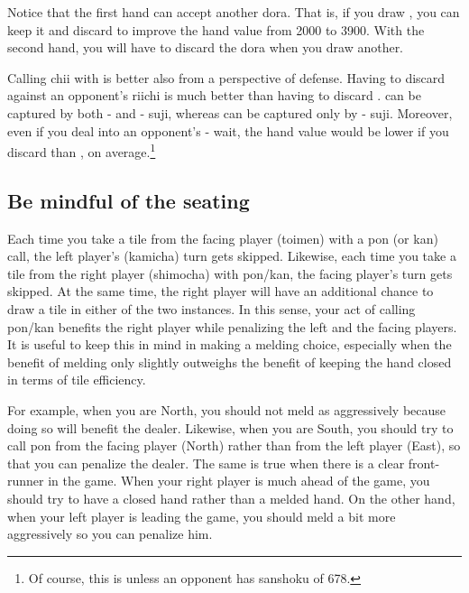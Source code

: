 Notice that the first hand can accept another {\jap dora}. That is, if you draw {\LARGE{}}, you can keep it and discard {\LARGE{}} to improve the hand value from 2000 to 3900.
With the second hand, you will have to discard the {\jap dora} when you draw another. 

\bigskip
Calling {\jap chii} with {\LARGE{}} is better also from a perspective of defense. Having to discard {\LARGE{}} against an opponent's riichi is much better than having to discard {\LARGE{}}. {\LARGE{}} can be captured by both {\LARGE{}-} and {\LARGE{}-} {\jap suji}, whereas {\LARGE{}} can be captured only by {\LARGE{}-} {\jap suji}. Moreover, even if you deal into an opponent's {\LARGE{}-} wait, the hand value would be lower if you discard {\LARGE{}} than {\LARGE{}}, on average.\footnote{Of course, this is unless an opponent has {\jap sanshoku} of 678.} 

\bigskip
\subsection{Be mindful of the seating}
Each time you take a tile from the facing player ({\jap toimen}) with a {\jap pon} (or {\jap kan}) call, the left player's ({\jap kamicha}) turn gets skipped. Likewise, each time you take a tile from the right player ({\jap shimocha}) with {\jap pon/kan}, the facing player's turn gets skipped. At the same time, the right player will have an additional chance to draw a tile in either of the two instances. In this sense, your act of calling {\jap pon/kan} benefits the right player while penalizing the left and the facing players. 
It is useful to keep this in mind in making a melding choice, especially when the benefit of melding only slightly outweighs the benefit of keeping the hand closed in terms of tile efficiency.

\bigskip
For example, when you are North, you should not meld as aggressively because doing so will benefit the dealer. Likewise, when you are South, you should try to call {\jap pon} from the facing player (North) rather than from the left player (East), so that you can penalize the dealer. 
The same is true when there is a clear front-runner in the game. When your right player is much ahead of the game, you should try to have a closed hand rather than a melded hand. On the other hand, when your left player is leading the game, you should meld a bit more aggressively so you can penalize him. 

